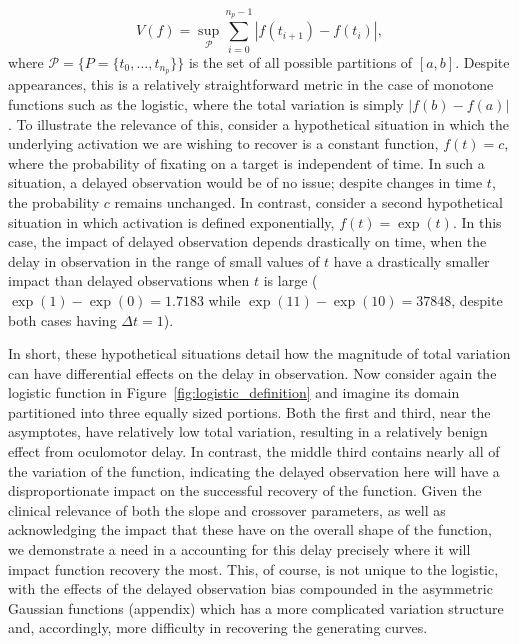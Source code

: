 \begin{equation}
V(f) = \underset{\mathcal{P}}{\sup} \sum_{i=0}^{n_p-1} \left|f(t_{i+1}) - f(t_i) \right|,
\end{equation}
where $\mathcal{P} = \{P = \{t_0, \dots, t_{n_p}\} \}$ is the set of all possible partitions of $[a,b]$. Despite appearances, this is a relatively straightforward metric in the case of monotone functions such as the logistic, where the total variation is simply $|f(b) - f(a)|$. To illustrate the relevance of this, consider a hypothetical situation in which the underlying activation we are wishing to recover is a constant function, $f(t) = c$, where the probability of fixating on a target is independent of time. In such a situation, a delayed observation would be of no issue; despite changes in time $t$, the probability $c$ remains unchanged. In contrast, consider a second hypothetical situation in which activation is defined exponentially, $f(t) = \exp(t)$. In this case, the impact of delayed observation depends drastically on time, when the delay in observation in the range of small values of $t$ have a drastically smaller impact than delayed observations when $t$ is large ($\exp(1) - \exp(0) = 1.7183$ while $\exp(11) - \exp(10) = 37848$, despite both cases having $\Delta t = 1$).

In short, these hypothetical situations detail how the magnitude of total variation can have differential effects on the delay in observation. Now consider again the logistic function in Figure~\ref{fig:logistic_definition} and imagine its domain partitioned into three equally sized portions. Both the first and third, near the asymptotes, have relatively low total variation, resulting in a relatively benign effect from oculomotor delay. In contrast, the middle third contains nearly all of the variation of the function, indicating the delayed observation here will have a disproportionate impact on the successful recovery of the function. Given the clinical relevance of  both the slope and crossover parameters, as well as acknowledging the impact that these have on the overall shape of the function, we demonstrate a need in a accounting for this delay precisely where it will impact function recovery the most. This, of course, is not unique to the logistic, with the effects of the delayed observation bias compounded in the asymmetric Gaussian functions (appendix) which has a more complicated variation structure and, accordingly, more difficulty in recovering the generating curves.








